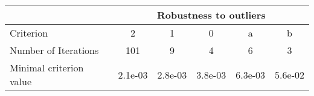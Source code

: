 \begin{tabular}{l|ccccc|}
 & \multicolumn{5}{c}{Robustness to outliers} \\
\hline
Criterion & 2 & 1 & 0 & a & b \\
Number of Iterations & 101 & 9 & 4 & 6 & 3 \\
Minimal criterion value & 2.1e-03 & 2.8e-03 & 3.8e-03 & 6.3e-03 & 5.6e-02 \\
\hline
\end{tabular}
